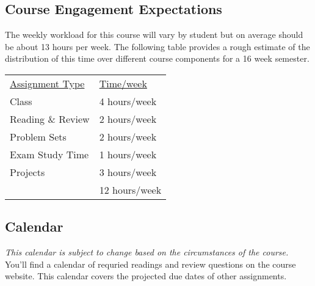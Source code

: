 \documentclass[10pt]{article}
\begin{document}
\subsection{Course Engagement Expectations}

The weekly workload for this course will vary by student but on average should be about 13 hours per week.  The following table provides a rough estimate of the distribution of this time over different course components for a 16 week semester.
\begin{center}
\begin{tabular}{ll}
\underline{Assignment Type}  & \underline{Time/week} \\
Class   & 4 hours/week \\
Reading \& Review  & 2 hours/week \\
Problem Sets & 2 hours/week \\
Exam Study Time & 1 hours/week \\
Projects  & 3 hours/week \\
\bottomrule
 & 12 hours/week
\end{tabular}
\end{center}


\subsection{Calendar}

\textit{This calendar is subject to change based on the circumstances of the course.} You'll find a calendar of requried readings and review questions on the course website. This calendar covers the projected due dates of other assignments.
\end{document}
